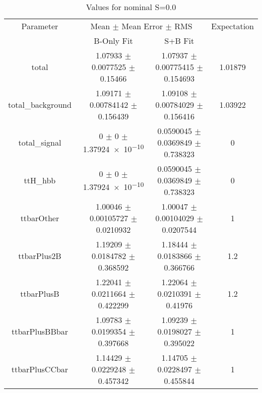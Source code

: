 \begin{table}
\centering
\caption{Values for nominal S=0.0}
\begin{tabular}{cccc}
\toprule
Parameter & \multicolumn{2}{c}{Mean $\pm$ Mean Error $\pm$ RMS} & Expectation\\
 & B-Only Fit & S+B Fit & \\
\midrule
total & \num{1.07933} $\pm$ \num{0.0077525} $\pm$ \num{0.15466} & \num{1.07937} $\pm$ \num{0.00775415} $\pm$ \num{0.154693} & \num{1.01879}\\
total\_background & \num{1.09171} $\pm$ \num{0.00784142} $\pm$ \num{0.156439} & \num{1.09108} $\pm$ \num{0.00784029} $\pm$ \num{0.156416} & \num{1.03922}\\
total\_signal & \num{0} $\pm$ \num{0} $\pm$ \num{1.37924e-10} & \num{0.0590045} $\pm$ \num{0.0369849} $\pm$ \num{0.738323} & \num{0}\\
ttH\_hbb & \num{0} $\pm$ \num{0} $\pm$ \num{1.37924e-10} & \num{0.0590045} $\pm$ \num{0.0369849} $\pm$ \num{0.738323} & \num{0}\\
ttbarOther & \num{1.00046} $\pm$ \num{0.00105727} $\pm$ \num{0.0210932} & \num{1.00047} $\pm$ \num{0.00104029} $\pm$ \num{0.0207544} & \num{1}\\
ttbarPlus2B & \num{1.19209} $\pm$ \num{0.0184782} $\pm$ \num{0.368592} & \num{1.18444} $\pm$ \num{0.0183866} $\pm$ \num{0.366766} & \num{1.2}\\
ttbarPlusB & \num{1.22041} $\pm$ \num{0.0211664} $\pm$ \num{0.422299} & \num{1.22064} $\pm$ \num{0.0210391} $\pm$ \num{0.41976} & \num{1.2}\\
ttbarPlusBBbar & \num{1.09783} $\pm$ \num{0.0199354} $\pm$ \num{0.397668} & \num{1.09239} $\pm$ \num{0.0198027} $\pm$ \num{0.395022} & \num{1}\\
ttbarPlusCCbar & \num{1.14429} $\pm$ \num{0.0229248} $\pm$ \num{0.457342} & \num{1.14705} $\pm$ \num{0.0228497} $\pm$ \num{0.455844} & \num{1}\\
\bottomrule
\end{tabular}
\end{table}